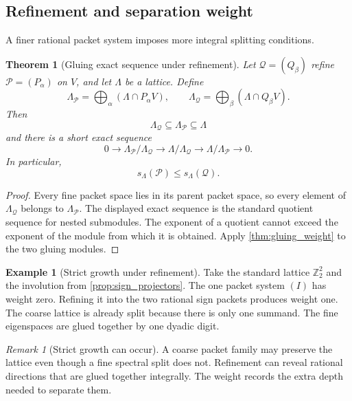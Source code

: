 \documentclass[11pt,a4paper]{article}
\newtheorem{theorem}{Theorem}[section]
\theoremstyle{definition}
\newtheorem{example}[example]{Example}
\theoremstyle{remark}
\newtheorem{remark}[remark]{Remark}
\newcommand{\Pcal}{\mathcal P}
\newcommand{\Qcal}{\mathcal Q}
\theoremstyle{definition}\newtheorem{construction}[theorem]{Construction}\newtheorem{certificate}[theorem]{Numerical Certificate}
\theoremstyle{remark}\newtheorem{boundary}[theorem]{Boundary}
\begin{document}
\subsection{Refinement and separation weight}

A finer rational packet system imposes more integral splitting conditions.

\begin{theorem}[Gluing exact sequence under refinement]\label{thm:gluing_refinement}
Let $\Qcal=(Q_\beta)$ refine $\Pcal=(P_\alpha)$ on $V$, and let $\Lambda$ be a lattice.  Define
\[
\Lambda_{\Pcal}
=
\bigoplus_\alpha(\Lambda\cap P_\alpha V),
\qquad
\Lambda_{\Qcal}
=
\bigoplus_\beta(\Lambda\cap Q_\beta V).
\]
Then
\[
\Lambda_{\Qcal}\subseteq\Lambda_{\Pcal}\subseteq\Lambda
\]
and there is a short exact sequence
\[
0
\longrightarrow
\Lambda_{\Pcal}/\Lambda_{\Qcal}
\longrightarrow
\Lambda/\Lambda_{\Qcal}
\longrightarrow
\Lambda/\Lambda_{\Pcal}
\longrightarrow0.
\]
In particular,
\[
\boxed{
s_\Lambda(\Pcal)\leq s_\Lambda(\Qcal).
}
\]
\end{theorem}

\begin{proof}
Every fine packet space lies in its parent packet space, so every element of $\Lambda_{\Qcal}$ belongs to $\Lambda_{\Pcal}$.  The displayed exact sequence is the standard quotient sequence for nested submodules.  The exponent of a quotient cannot exceed the exponent of the module from which it is obtained.  Apply \cref{thm:gluing_weight} to the two gluing modules.
\end{proof}

\begin{example}[Strict growth under refinement]\label{ex:strict_weight_growth}
Take the standard lattice $\mathbb Z_2^2$ and the involution from \cref{prop:sign_projectors}.  The one packet system $(I)$ has weight zero.  Refining it into the two rational sign packets produces weight one.  The coarse lattice is already split because there is only one summand.  The fine eigenspaces are glued together by one dyadic digit.
\end{example}

\begin{remark}[Strict growth can occur]\label{rem:strict_growth}
A coarse packet family may preserve the lattice even though a fine spectral split does not.  Refinement can reveal rational directions that are glued together integrally.  The weight records the extra depth needed to separate them.
\end{remark}
\end{document}

